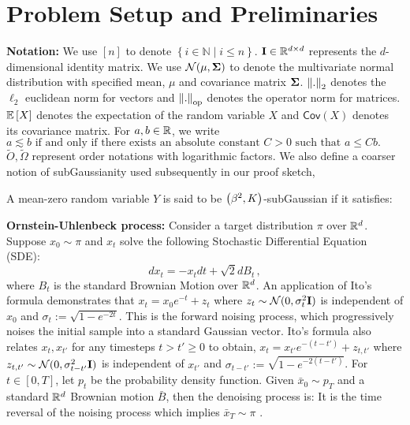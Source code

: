 \section{Problem Setup and Preliminaries}\label{sec:problemsetup}

\textbf{Notation:} We use $[n]$ to denote $\left\{i \in \mathbb{N} \;|\; i\leq n\right\}$. $\mathbf{I} \in \mathbb{R}^{d\times d}$ represents the $d$-dimensional identity matrix. We use $\mathcal{N}(\mu, \boldsymbol{\Sigma})$ to denote the multivariate normal distribution with specified mean, $\mu$ and covariance matrix $\boldsymbol{\Sigma}$. $\left\lVert.\right\rVert_{2}$ denotes the $\ell_{2}$ euclidean norm for vectors and $\left\lVert.\right\rVert_{\textup{op}}$ denotes the operator norm for matrices. $\mathbb{E}\left[X\right]$ denotes the expectation of the random variable $X$ and $\mathsf{Cov}(X)$ denotes its covariance matrix. For $a, b \in \mathbb{R}$, we write $a \lesssim b \text{ if and only if there exists an absolute constant } C > 0 \text{ such that } a \leq C b.$ $\tilde{O}, \tilde{\Omega}$ represent order notations with logarithmic factors. We also define a coarser notion of subGaussianity used subsequently in our proof sketch, 
\begin{definition}\label{definition:new_subGaussian_def}
A mean-zero random variable $Y$ is said to be $\left(\beta^2,K\right)$-subGaussian if it satisfies:
\end{definition}

\textbf{Ornstein-Uhlenbeck process:} Consider a target distribution $\pi$ over $\mathbb{R}^d$. Suppose $x_0 \sim \pi$ and $x_t$ solve the following Stochastic Differential Equation (SDE):
\begin{equation}\label{eq:fwd_noise}
    dx_t = -x_t dt + \sqrt{2}dB_t\,,
\end{equation}
where $B_t$ is the standard Brownian Motion over $\mathbb{R}^d$. An application of Ito's formula demonstrates that $x_t = x_0e^{-t} + z_t$ where $z_t \sim \mathcal{N}(0,\sigma_{t}^{2}\mathbf{I})$ is independent of $x_0$ and $\sigma_{t} := \sqrt{1-e^{-2t}}$. This is the forward noising process, which progressively noises the initial sample into a standard Gaussian vector. Ito's formula also relates $x_{t}, x_{t'}$ for any timesteps $t > t' \geq 0$ to obtain, $x_t = x_{t'}e^{-(t-t')} + z_{t,t'}$ where $z_{t,t'} \sim \mathcal{N}(0,\sigma_{t-t'}^{2}\mathbf{I})$ is independent of $x_{t'}$ and $\sigma_{t-t'} := \sqrt{1-e^{-2(t-t')}}$. For $t \in [0,T]$, let $p_t$ be the probability density function. Given $\bar{x}_0 \sim p_T$ and a standard $\mathbb{R}^d$ Brownian motion $\bar{B}$, then the denoising process is: 
 It is the time reversal of the noising process which implies $\bar{x}_T \sim \pi$ \cite{song2020score}. 

